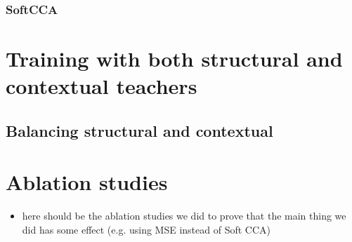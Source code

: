 \subsubsection{SoftCCA}

\section{Training with both structural and contextual teachers}
\subsection{Balancing structural and contextual}


\section{Ablation studies}

\begin{itemize}
    \item here should be the ablation studies we did to prove that the main
        thing we did has some effect (e.g. using MSE instead of Soft CCA)
\end{itemize}
